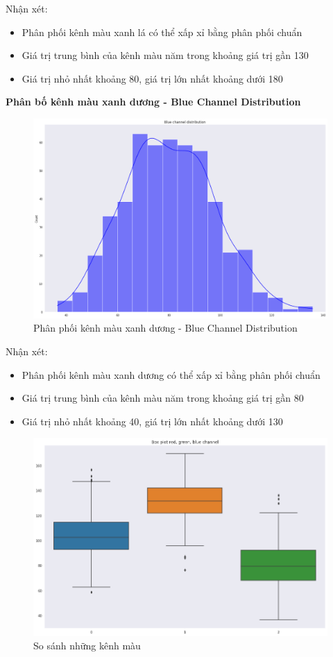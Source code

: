 \documentclass{article}
\begin{document}
	Nhận xét:
	\begin{itemize}
		\item Phân phối kênh màu xanh lá có thể xấp xỉ bằng phân phối chuẩn
		\item Giá trị trung bình của kênh màu năm trong khoảng giá trị gần 130
		\item Giá trị nhỏ nhất khoảng 80, giá trị lớn nhất khoảng dưới 180
	\end{itemize}
	\textbf{Phân bố kênh màu xanh dương - Blue Channel Distribution}
	\begin{figure}[H]
		\centering
		\includegraphics[width=1\linewidth]{images/blue_channel_distribution.png}
		\caption{Phân phối kênh màu xanh dương - Blue Channel Distribution}
		\label{fig:writing-thesis}
	\end{figure}
	Nhận xét:
	\begin{itemize}
		\item Phân phối kênh màu xanh dương có thể xấp xỉ bằng phân phối chuẩn
		\item Giá trị trung bình của kênh màu năm trong khoảng giá trị gần 80
		\item Giá trị nhỏ nhất khoảng 40, giá trị lớn nhất khoảng dưới 130
	\end{itemize}
	\begin{figure}[H]
		\centering
		\includegraphics[width=1\linewidth]{images/boxplot_channels_distribution.png}
		\caption{So sánh những kênh màu}
		\label{fig:writing-thesis}
	\end{figure}
\end{document}
